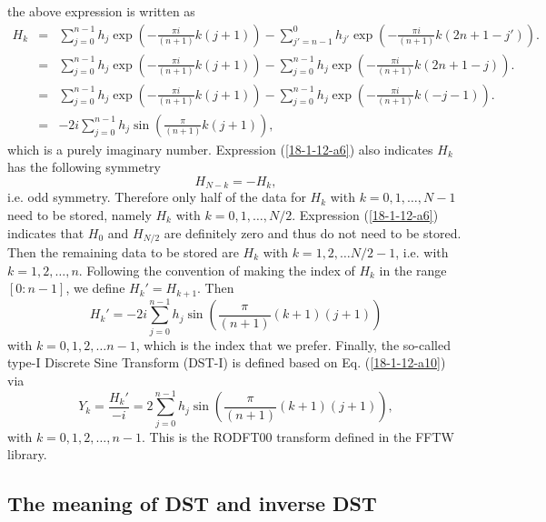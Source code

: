 \documentclass{article}
\begin{document}
the above expression is written as
\begin{eqnarray}
  H_k & = & \sum_{j = 0}^{n - 1} h_j \exp \left( - \frac{\pi i}{(n + 1)} k (j
  + 1) \right) - \sum_{j' = n - 1}^0 h_{j'} \exp \left( - \frac{\pi i}{(n +
  1)} k (2 n + 1 - j') \right) . \nonumber\\
  & = & \sum_{j = 0}^{n - 1} h_j \exp \left( - \frac{\pi i}{(n + 1)} k (j +
  1) \right) - \sum_{j = 0}^{n - 1} h_j \exp \left( - \frac{\pi i}{(n + 1)} k
  (2 n + 1 - j) \right) . \nonumber\\
  & = & \sum_{j = 0}^{n - 1} h_j \exp \left( - \frac{\pi i}{(n + 1)} k (j +
  1) \right) - \sum_{j = 0}^{n - 1} h_j \exp \left( - \frac{\pi i}{(n + 1)} k
  (- j - 1) \right) . \nonumber\\
  & = & - 2 i \sum_{j = 0}^{n - 1} h_j \sin \left( \frac{\pi}{(n + 1)} k (j +
  1) \right),  \label{18-1-12-a6}
\end{eqnarray}
which is a purely imaginary number. Expression (\ref{18-1-12-a6}) also
indicates $H_k$ has the following symmetry
\begin{equation}
  \label{18-1-12-a8} H_{N - k} = - H_k,
\end{equation}
i.e. odd symmetry. Therefore only half of the data for $H_k$ with $k = 0, 1,
\ldots, N - 1$ need to be stored, namely $H_k$ with $k = 0, 1, \ldots, N / 2$.
Expression (\ref{18-1-12-a6}) indicates that $H_0$ and $H_{N / 2}$ are
definitely zero and thus do not need to be stored. Then the remaining data to
be stored are $H_k$ with $k = 1, 2, \ldots N / 2 - 1$, i.e. with $k = 1, 2,
\ldots, n$. Following the convention of making the index of $H_k$ in the range
$[0 : n - 1]$, we define $H_k' = H_{k + 1}$. Then
\begin{equation}
  \label{18-1-12-a10} H_k' = - 2 i \sum_{j = 0}^{n - 1} h_j \sin \left(
  \frac{\pi}{(n + 1)}  (k + 1)  (j + 1) \right)
\end{equation}
with $k = 0, 1, 2, \ldots n - 1$, which is the index that we prefer. Finally,
the so-called type-I Discrete Sine Transform (DST-I) is defined based on Eq.
(\ref{18-1-12-a10}) via
\begin{equation}
  Y_k = \frac{H_k'}{- i} = 2 \sum_{j = 0}^{n - 1} h_j \sin \left(
  \frac{\pi}{(n + 1)}  (k + 1)  (j + 1) \right),
\end{equation}
with $k = 0, 1, 2, \ldots, n - 1$. This is the RODFT00 transform defined in
the FFTW library.

\subsection{The meaning of DST and inverse DST}
\end{document}
